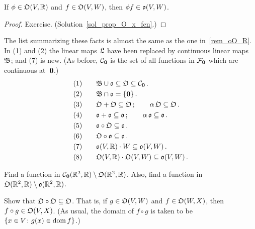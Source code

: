 \begin{prop}\label{prop_O_x_fcn}  If $\phi \in \mathfrak{O}(V,\mathbb{R})$ and $f \in \mathfrak{O}(V,W)$,
then $\phi f \in \mathfrak{o}(V,W)$.
\end{prop}

\begin{proof} Exercise. (Solution~\ref{sol_prop_O_x_fcn}.)  \ns   \end{proof}

\begin{rem}  The list summarizing these facts is almost the same as the one in~\ref{rem_oO_R}.
In (1) and (2) the linear maps $\mathfrak{L}$ have been replaced by continuous linear maps $\mathfrak{B}$; and (7) is new.  (As before,
$\mathcal{C}_{\mathbf{0}}$ is the set of all functions in $\mathcal{F}_{\mathbf{0}}$ which are continuous at~$\mathbf{0}$.)
  \begin{align*}
    &(1)\qquad \mathfrak{B} \cup \mathfrak{o} \subseteq \mathfrak{O} \subseteq \mathcal{C}_{\mathbf{0}} \, .\\
    &(2)\qquad \mathfrak{B} \cap \mathfrak{o} = \{\mathbf{0}\}\,. \\
    &(3)\qquad \mathfrak{O} + \mathfrak{O} \subseteq \mathfrak{O}\,; \qquad \alpha\,\mathfrak{O} \subseteq \mathfrak{O}\,. \\
    &(4)\qquad \mathfrak{o} + \mathfrak{o} \subseteq \mathfrak{o}\,; \qquad \alpha\,\mathfrak{o} \subseteq \mathfrak{o}\,. \\
    &(5)\qquad \mathfrak{o} \circ \mathfrak{O} \subseteq \mathfrak{o}\,. \\
    &(6)\qquad \mathfrak{O} \circ \mathfrak{o} \subseteq \mathfrak{o}\,. \\
    &(7)\qquad \mathfrak{o}(V,\mathbb{R})\cdot W\subseteq \mathfrak{o}(V,W)\,.\\
    &(8)\qquad \mathfrak{O}(V,\mathbb{R})\cdot \mathfrak{O}(V,W) \subseteq  \mathfrak{o}(V,W)\,.
  \end{align*}
\end{rem}

\begin{prob}  Find a function in $\mathcal{C}_{\mathbf{0}}(\mathbb{R}^2, \mathbb{R}) \setminus \mathfrak{O}(\mathbb{R}^2, \mathbb{R})$.  Also,
find a function in $\mathfrak{O}(\mathbb{R}^2, \mathbb{R}) \setminus \mathfrak{o}(\mathbb{R}^2, \mathbb{R})$.
\end{prob}

\begin{prob}\label{prob_O_comp_O}  Show that $\mathfrak{O} \circ \mathfrak{O}\subseteq\mathfrak{O}$.  That is,
if $g \in \mathfrak{O}(V,W)$ and $f \in \mathfrak{O}(W,X)$, then $f \circ g \in \mathfrak{O}(V,X)$.  (As
usual, the domain of $f \circ g$ is taken to be $\{x \in V \colon g(x) \in \operatorname{dom} f\}$.)
\end{prob}

